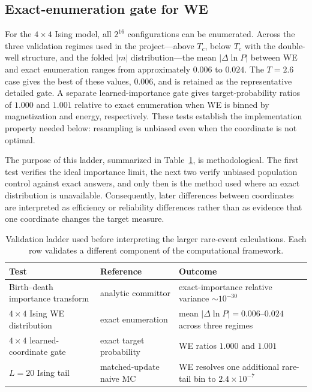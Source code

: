 \documentclass[a4paper,fleqn]{cas-sc}
\begin{document}
\subsection{Exact-enumeration gate for WE}\label{sec:gate}
For the $4\times4$ Ising model, all $2^{16}$ configurations can be enumerated. Across the
three validation regimes used in the project---above $T_c$, below $T_c$ with the double-well
structure, and the folded $|m|$ distribution---the mean $|\Delta\ln P|$ between WE and exact
enumeration ranges from approximately $0.006$ to $0.024$. The $T=2.6$ case gives the best of
these values, $0.006$, and is retained as the representative detailed gate. A separate
learned-importance gate gives target-probability ratios of $1.000$ and $1.001$ relative to
exact enumeration when WE is binned by magnetization and energy, respectively. These tests
establish the implementation property needed below: resampling is unbiased even when the
coordinate is not optimal.

The purpose of this ladder, summarized in Table~\ref{tab:ladder}, is methodological. The first
test verifies the ideal importance limit, the next two verify unbiased population control
against exact answers, and only then is the method used where an exact distribution is
unavailable. Consequently, later differences between coordinates are interpreted as efficiency
or reliability differences rather than as evidence that one coordinate changes the target
measure.

\begin{table}[H]
\centering\small
\caption{Validation ladder used before interpreting the larger rare-event calculations. Each
row validates a different component of the computational framework.}
\label{tab:ladder}
\begin{tabular}{p{}p{}p{}}
\toprule
Test & Reference & Outcome \\
\midrule
Birth--death importance transform & analytic committor & exact-importance relative variance
$\sim10^{-30}$ \\
$4\times4$ Ising WE distribution & exact enumeration & mean $|\Delta\ln P|=0.006$--$0.024$
across three regimes \\
$4\times4$ learned-coordinate gate & exact target probability & WE ratios $1.000$ and
$1.001$ \\
$L=20$ Ising tail & matched-update naive MC & WE resolves one additional rare-tail bin to
$2.4\times10^{-7}$ \\
\bottomrule
\end{tabular}
\end{table}
\end{document}

